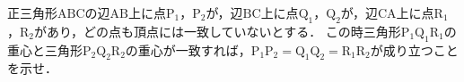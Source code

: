 \documentclass[../../main.tex]{subfiles}
\begin{document}
正三角形$\mathrm{ABC}$の辺$\mathrm{AB}$上に点$\mathrm{P}_1$，$\mathrm{P}_2$が，辺$\mathrm{BC}$上に点$\mathrm{Q}_1$，$\mathrm{Q}_2$が，辺$\mathrm{CA}$上に点$\mathrm{R}_1$，$\mathrm{R}_2$があり，どの点も頂点には一致していないとする．
この時三角形$\mathrm{P_1Q_1R_1}$の重心と三角形$\mathrm{P_2Q_2R_2}$の重心が一致すれば，$\mathrm{P_1P_2}=\mathrm{Q_1Q_2}=\mathrm{R_1R_2}$が成り立つことを示せ．
\end{document}

